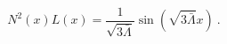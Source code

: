 \begin{equation}
N^2(x)L(x)=\frac{1}{\sqrt{3\bar\Lambda}}\sin(\sqrt{3\bar\Lambda}x) \ .
\end{equation}

